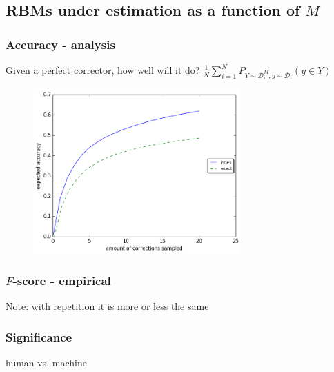 \documentclass{beamer}
\begin{document}
\subsection{RBMs under estimation as a function of $M$}
\begin{frame}
	\frametitle{Accuracy - analysis}
	Given a perfect corrector, how well will it do?
	$\frac{1}{N}\sum_{i=1}^N P_{Y \sim \mathcal{D}_i^M, y \sim \mathcal{D}_i}\left(y \in Y\right)$
	\begin{figure}
		\includegraphics[width=8cm]{noSig_repeat_1000_accuracy}
	\end{figure}
\end{frame}
\begin{frame}
	\frametitle{$F$-score - empirical}
		\begin{figure}
			\texttt{[image: \$F\_\{0.5]}$_Ms_significance}
		\end{figure}
	Note: with repetition it is more or less the same
\end{frame}
\begin{frame}
	\frametitle{Significance}
	human vs. machine

	\begin{figure}
		\texttt{[image: \$F\_\{0.5]}$_significance}
	\end{figure}
\end{frame}
\end{document}
